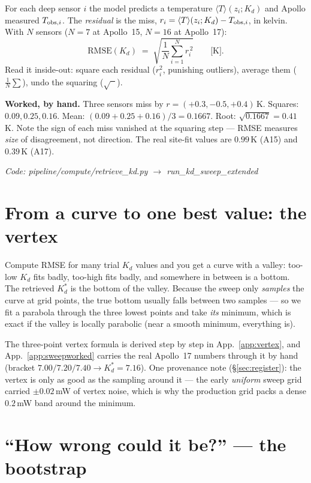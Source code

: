 \documentclass[11pt]{report}
\newcommand{\Tm}{\langle T\rangle}
\newcommand{\code}[1]{{\ttfamily\small #1}}
\begin{document}
For each deep sensor $i$ the model predicts a temperature
$\Tm(z_i; K_d)$ and Apollo measured $T_{{\rm obs},i}$. The \emph{residual} is
the miss, $r_i = \Tm(z_i;K_d) - T_{{\rm obs},i}$, in kelvin. With $N$ sensors
($N{=}7$ at Apollo~15, $N{=}16$ at Apollo~17):
\[
\mathrm{RMSE}(K_d) \;=\; \sqrt{\frac{1}{N}\sum_{i=1}^{N} r_i^{\,2}}
\qquad\text{[K].}
\]
Read it inside-out: square each residual ($r_i^2$, punishing outliers), average
them ($\frac{1}{N}\sum$), undo the squaring ($\sqrt{\phantom{x}}$).

\medskip
\noindent\textbf{Worked, by hand.} Three sensors miss by $r = (+0.3, -0.5,
+0.4)$\,K. Squares: $0.09, 0.25, 0.16$. Mean: $(0.09{+}0.25{+}0.16)/3 =
0.1667$. Root: $\sqrt{0.1667} = 0.41$\,K. Note the sign of each miss vanished
at the squaring step --- RMSE measures \emph{size} of disagreement, not
direction. The real site-fit values are $0.99$\,K (A15) and $0.39$\,K (A17).

{\small\color{dim}\textit{Code: \code{pipeline/compute/retrieve\_kd.py}
$\to$ \code{run\_kd\_sweep\_extended}}}

\section{From a curve to one best value: the vertex}\label{sec:vertexzero}

\begin{plain}
Compute RMSE for many trial $K_d$ values and you get a curve with a valley:
too-low $K_d$ fits badly, too-high fits badly, and somewhere in between is a
bottom. The retrieved $K_d^{*}$ is the bottom of the valley. Because the sweep
only \emph{samples} the curve at grid points, the true bottom usually falls
between two samples --- so we fit a parabola through the three lowest points
and take \emph{its} minimum, which is exact if the valley is locally
parabolic (near a smooth minimum, everything is).
\end{plain}

The three-point vertex formula is derived step by step in
App.~\ref{app:vertex}, and App.~\ref{app:sweepworked} carries the real
Apollo~17 numbers through it by hand (bracket $7.00/7.20/7.40 \rightarrow
K_d^{*}=7.16$). One provenance note (\S\ref{sec:register}): the vertex is only
as good as the sampling around it --- the early \emph{uniform} sweep grid
carried $\pm 0.02$\,mW of vertex noise, which is why the production grid packs
a dense $0.2$\,mW band around the minimum.

\section{``How wrong could it be?'' --- the bootstrap}\label{sec:bootzero}
\end{document}
